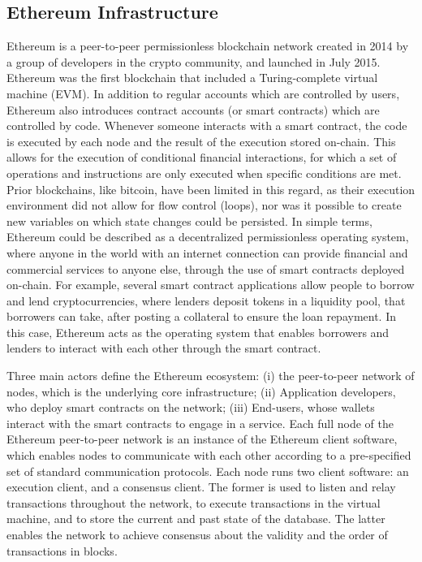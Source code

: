 \documentclass[No]{AEA}
\begin{document}
\subsection{Ethereum Infrastructure}


Ethereum is a peer-to-peer permissionless blockchain network created in 2014 by a group of developers in the crypto community, and launched in July 2015. Ethereum was the first blockchain that included a Turing-complete virtual machine (EVM). In addition to regular accounts which are controlled by users, Ethereum also introduces contract accounts (or smart contracts) which are controlled by code. Whenever someone interacts with a smart contract, the code is executed by each node and the result of the execution stored on-chain. This allows for the execution of conditional financial interactions, for which a set of operations and instructions are only executed when specific conditions are met. Prior blockchains, like bitcoin, have been limited in this regard, as their execution environment did not allow for flow control (loops), nor was it possible to create new variables on which state changes could be persisted. In simple terms, Ethereum could be described as a decentralized permissionless operating system, where anyone in the world with an internet connection can provide financial and commercial services to anyone else, through the use of smart contracts deployed on-chain. For example, several smart contract applications allow people to borrow and lend cryptocurrencies, where lenders deposit tokens in a liquidity pool, that borrowers can take, after posting a collateral to ensure the loan repayment. In this case, Ethereum acts as the operating system that enables borrowers and lenders to interact with each other through the smart contract.

Three main actors define the Ethereum ecosystem: (i) the peer-to-peer network of nodes, which is the underlying core infrastructure; (ii) Application developers, who deploy smart contracts on the network; (iii) End-users, whose wallets interact with the smart contracts to engage in a service.     
Each full node of the Ethereum peer-to-peer network is an instance of the Ethereum client software, which enables nodes to communicate with each  other according to a pre-specified set of standard communication protocols. Each node runs two client software: an execution client, and a consensus client. The former is used to listen and relay transactions throughout the network, to execute transactions in the virtual machine, and to store the current and past state of the database. The latter enables the network to achieve consensus about the validity and the order of transactions in blocks. 
\end{document}
